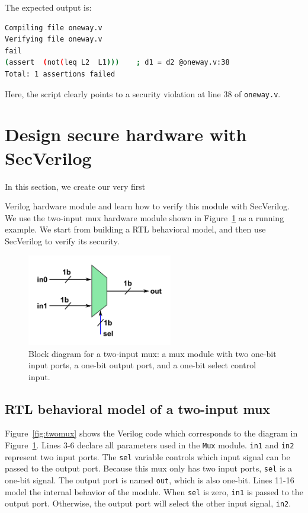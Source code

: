 \documentclass [12pt, oneside, a4paper]{article}
\newcommand{\code}[1]{\texttt{#1}}
\begin{document}
The expected output is:

\begin{lstlisting}[language=bash, frame=none, numbers=none,
keywordstyle=\footnotesize\bfseries, morekeywords={make}]
Compiling file oneway.v
Verifying file oneway.v
fail
(assert  (not(leq L2  L1)))    ; d1 = d2 @oneway.v:38
Total: 1 assertions failed
\end{lstlisting}

Here, the script clearly points to a security violation at line 38 of
\code{oneway.v}.

\section{Design secure hardware with SecVerilog}

In this section, we create our very first {Verilog hardware module and
learn how to verify this module with SecVerilog. We use the two-input
mux hardware module shown in Figure~\ref{fig:blockdiagram} as a running
example. We start from building a RTL behavioral model, and then use
SecVerilog to verify its security.

\begin{figure}
\centering
\includegraphics[width=2.5in]{Two-Input-Mux.png}
\caption{Block diagram for a two-input mux: a mux module with two
one-bit input ports, a one-bit output port, and a one-bit select
control input.}
\label{fig:blockdiagram}
\end{figure}
	
\subsection{RTL behavioral model of a two-input mux}

Figure~\ref{fig:twomux} shows the Verilog code which corresponds to the diagram in
Figure~\ref{fig:blockdiagram}. Lines 3-6 declare all parameters used
in the \code{Mux} module. \code{in1} and \code{in2} represent two
input ports. The \code{sel} variable controls which input signal can
be passed to the output port. Because this mux only has two
input ports, \code{sel} is a one-bit signal. The output port is
named \code{out}, which is also one-bit. Lines 11-16 model the
internal behavior of the module. When \code{sel} is zero, \code{in1}
is passed to the output port. Otherwise, the output port will select
the other input signal, \code{in2}.

}
\end{document}
